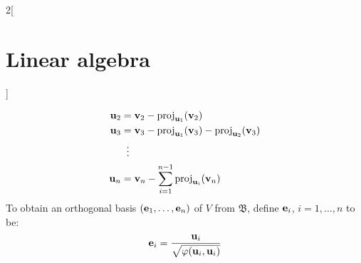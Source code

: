 \documentclass[../../../main.tex]{subfiles}
\begin{document}
\begin{multicols}{2}[\section{Linear algebra}]
\begin{method}
\begin{align*}
      \boldsymbol{\mathrm{u}}_2 & =\boldsymbol{\mathrm{v}}_2-\text{proj}_{\boldsymbol{\mathrm{u}}_1}(\boldsymbol{\mathrm{v}}_2)                                                          \\
      \boldsymbol{\mathrm{u}}_3 & =\boldsymbol{\mathrm{v}}_3-\text{proj}_{\boldsymbol{\mathrm{u}}_1}(\boldsymbol{\mathrm{v}}_3)-\text{proj}_{\boldsymbol{\mathrm{u}}_2}(\boldsymbol{\mathrm{v}}_3) \\
                           & \;\;\vdots                                                                                                                              \\
      \boldsymbol{\mathrm{u}}_n & =\boldsymbol{\mathrm{v}}_n-\sum_{i=1}^{n-1}\text{proj}_{\boldsymbol{\mathrm{u}}_i}(\boldsymbol{\mathrm{v}}_n)
    \end{align*}
    To obtain an orthogonal basis $(\boldsymbol{\mathrm{e}}_1,\ldots,\boldsymbol{\mathrm{e}}_n)$ of $V$ from $\mathfrak{B}$, define $\boldsymbol{\mathrm{e}}_i$, $i=1,\ldots,n$ to be: $$\boldsymbol{\mathrm{e}}_i=\frac{\boldsymbol{\mathrm{u}}_i}{\sqrt{\varphi(\boldsymbol{\mathrm{u}}_i,\boldsymbol{\mathrm{u}}_i)}}$$
  \end{method}

\end{multicols}
\end{document}
